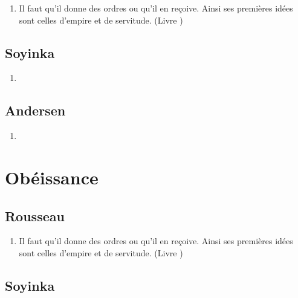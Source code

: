 \documentclass[a4paper, 11pt, hidelinks]{article}
\newcommand{\rb}[1]{\Romanbar{#1}}
\begin{document}
\begin{enumerate}
    \item Il faut qu'il donne des ordres ou qu'il en reçoive. Ainsi ses premières idées sont celles d'empire et de servitude. (Livre \rb{1})
\end{enumerate}



\subsection{Soyinka}


\begin{enumerate}
    \item 
\end{enumerate}




\subsection{Andersen}


\begin{enumerate}
    \item 
\end{enumerate}
















\section{Obéissance}



\subsection{Rousseau}


\begin{enumerate}
    \item Il faut qu'il donne des ordres ou qu'il en reçoive. Ainsi ses premières idées sont celles d'empire et de servitude. (Livre \rb{1})

\end{enumerate}



\subsection{Soyinka}
\end{document}
